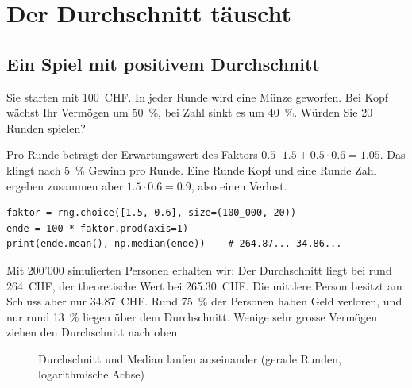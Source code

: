 \chapter{Der Durchschnitt täuscht}



\section{Ein Spiel mit positivem Durchschnitt}
Sie starten mit 100~CHF. In jeder Runde wird eine Münze geworfen. Bei Kopf wächst Ihr Vermögen um 50~\%, bei Zahl sinkt es um 40~\%. Würden Sie 20 Runden spielen?

Pro Runde beträgt der Erwartungswert des Faktors $0.5\cdot 1.5 + 0.5\cdot 0.6 = 1.05$. Das klingt nach 5~\% Gewinn pro Runde. Eine Runde Kopf und eine Runde Zahl ergeben zusammen aber $1.5\cdot 0.6 = 0.9$, also einen Verlust.

\begin{lstlisting}[style=Python]
faktor = rng.choice([1.5, 0.6], size=(100_000, 20))
ende = 100 * faktor.prod(axis=1)
print(ende.mean(), np.median(ende))    # 264.87... 34.86...
\end{lstlisting}

Mit 200'000 simulierten Personen erhalten wir: Der Durchschnitt liegt bei rund 264~CHF, der theoretische Wert bei 265.30~CHF. Die mittlere Person besitzt am Schluss aber nur 34.87~CHF. Rund 75~\% der Personen haben Geld verloren, und nur rund 13~\% liegen über dem Durchschnitt. Wenige sehr grosse Vermögen ziehen den Durchschnitt nach oben.

\begin{figure}[H]
	\centering
	\caption{Durchschnitt und Median laufen auseinander (gerade Runden, logarithmische Achse)}
\end{figure}

